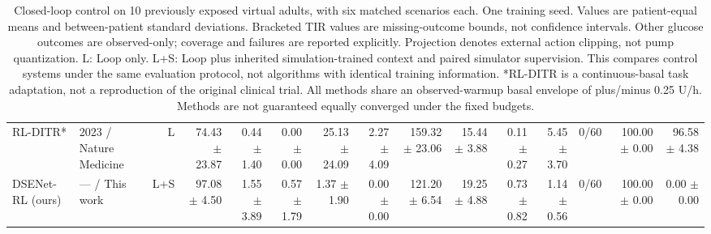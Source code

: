 \begin{table}[t]
{\begin{tabular}{llrrrrrrrrrrrrr}
RL-DITR* & 2023 / Nature Medicine & L & 74.43 $\pm$ 23.87 & 0.44 $\pm$ 1.40 & 0.00 $\pm$ 0.00 & 25.13 $\pm$ 24.09 & 2.27 $\pm$ 4.09 & 159.32 $\pm$ 23.06 & 15.44 $\pm$ 3.88 & 0.11 $\pm$ 0.27 & 5.45 $\pm$ 3.70 & 0/60 & 100.00 $\pm$ 0.00 & 96.58 $\pm$ 4.38 \\
DSENet-RL (ours) & — / This work & L+S & 97.08 $\pm$ 4.50 & 1.55 $\pm$ 3.89 & 0.57 $\pm$ 1.79 & 1.37 $\pm$ 1.90 & 0.00 $\pm$ 0.00 & 121.20 $\pm$ 6.54 & 19.25 $\pm$ 4.88 & 0.73 $\pm$ 0.82 & 1.14 $\pm$ 0.56 & 0/60 & 100.00 $\pm$ 0.00 & 0.00 $\pm$ 0.00 \\
\bottomrule
\end{tabular}}
\caption{Closed-loop control on 10 previously exposed virtual adults, with six matched scenarios each. One training seed. Values are patient-equal means and between-patient standard deviations. Bracketed TIR values are missing-outcome bounds, not confidence intervals. Other glucose outcomes are observed-only; coverage and failures are reported explicitly. Projection denotes external action clipping, not pump quantization. L: Loop only. L+S: Loop plus inherited simulation-trained context and paired simulator supervision. This compares control systems under the same evaluation protocol, not algorithms with identical training information. *RL-DITR is a continuous-basal task adaptation, not a reproduction of the original clinical trial. All methods share an observed-warmup basal envelope of plus/minus 0.25 U/h. Methods are not guaranteed equally converged under the fixed budgets.}
\label{tab:main-control}
\end{table}
